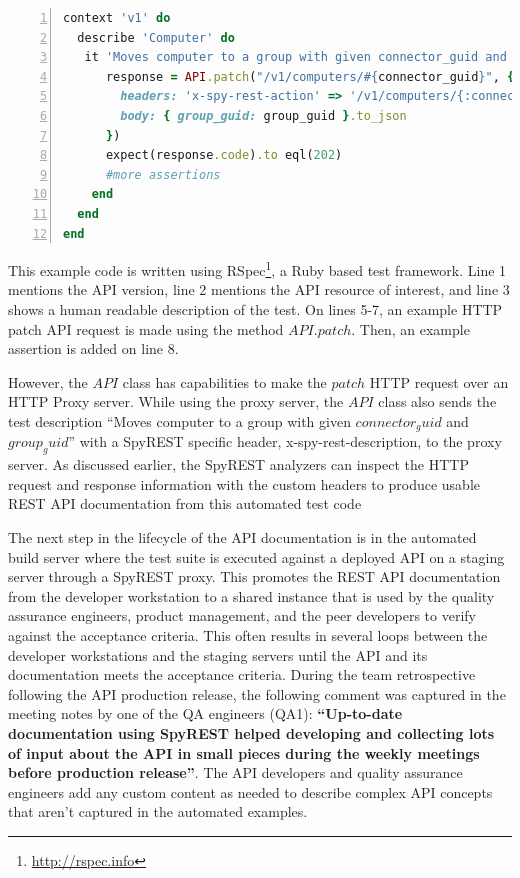 \documentclass[10pt, conference]{IEEEtran}
\begin{document}
\begin{lstlisting}[language=Ruby,breaklines=true,showspaces=false,showstringspaces=false,numbers=left,xleftmargin=2em,caption={Functional Test Code},label=listing_test]
context 'v1' do
  describe 'Computer' do
   it 'Moves computer to a group with given connector_guid and group_guid' do
      response = API.patch("/v1/computers/#{connector_guid}", {
        headers: 'x-spy-rest-action' => '/v1/computers/{:connector_guid}',
        body: { group_guid: group_guid }.to_json
      })
      expect(response.code).to eql(202)
      #more assertions
    end
  end
end
\end{lstlisting}

This example code is written using RSpec\footnote{\url{http://rspec.info}}, a Ruby based test framework. Line 1 mentions the API version, line 2 mentions the API resource of interest, and line 3 shows a human readable description of the test. On lines 5-7, an example HTTP patch API request is made using the method $API.patch$. Then, an example assertion is added on line 8.

However, the $API$ class has capabilities to make the $patch$ HTTP request over an HTTP Proxy server. While using the proxy server, the $API$ class also sends the test description ``Moves computer to a group with given $connector_guid$ and $group_guid$'' with a SpyREST specific header, x-spy-rest-description, to the proxy server. As discussed earlier, the SpyREST analyzers can inspect the HTTP request and response information with the custom headers to produce usable REST API documentation from this automated test code


The next step in the lifecycle of the API documentation is in the automated build server where the test suite is executed against a deployed API on a staging server through a SpyREST proxy. This promotes the REST API documentation from the developer workstation to a shared instance that is used by the quality assurance engineers, product management, and the peer developers to verify against the acceptance criteria. This often results in several loops between the developer workstations and the staging servers until the API and its documentation meets the acceptance criteria. During the team retrospective following the API production release, the following comment was captured in the meeting notes by one of the QA engineers (QA1):  \textbf{``Up-to-date documentation using SpyREST helped developing and collecting lots of input about the API in small pieces during the weekly meetings before production release''}. The API developers and quality assurance engineers add any custom content as needed to describe complex API concepts that aren't captured in the automated examples.
\end{document}
